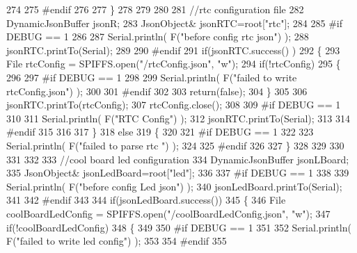 \begin{DoxyCode}
274     
275 \textcolor{preprocessor}{    #endif}
276 
277     \}
278     
279     
280     
281     \textcolor{comment}{//rtc configuration file}
282     DynamicJsonBuffer jsonR;
283         JsonObject& jsonRTC=root[\textcolor{stringliteral}{"rtc"}];
284 
285 \textcolor{preprocessor}{#if DEBUG == 1 }
286     
287     Serial.println( F(\textcolor{stringliteral}{"before config rtc json"}) );
288     jsonRTC.printTo(Serial);
289 
290 \textcolor{preprocessor}{#endif}
291     \textcolor{keywordflow}{if}(jsonRTC.success() )
292     \{
293         File rtcConfig = SPIFFS.open(\textcolor{stringliteral}{"/rtcConfig.json"}, \textcolor{stringliteral}{"w"});   
294         \textcolor{keywordflow}{if}(!rtcConfig)
295         \{
296         
297 \textcolor{preprocessor}{        #if DEBUG == 1 }
298 
299             Serial.println( F(\textcolor{stringliteral}{"failed to write rtcConfig.json"}) );
300 
301 \textcolor{preprocessor}{        #endif}
302 
303             \textcolor{keywordflow}{return}(\textcolor{keyword}{false});
304         \}
305 
306         jsonRTC.printTo(rtcConfig);
307         rtcConfig.close();
308 
309 \textcolor{preprocessor}{    #if DEBUG == 1 }
310 
311         Serial.println( F(\textcolor{stringliteral}{"RTC Config"}) );
312         jsonRTC.printTo(Serial);
313     
314 \textcolor{preprocessor}{    #endif}
315 
316     
317     \}
318     \textcolor{keywordflow}{else}
319     \{
320     
321 \textcolor{preprocessor}{    #if DEBUG == 1 }
322 
323         Serial.println( F(\textcolor{stringliteral}{"failed to parse rtc "}) );
324     
325 \textcolor{preprocessor}{    #endif}
326 
327     \}
328 
329     
330     
331     
332     
333         \textcolor{comment}{//cool board led configuration}
334     DynamicJsonBuffer jsonLBoard;
335         JsonObject& jsonLedBoard=root[\textcolor{stringliteral}{"led"}];
336     
337 \textcolor{preprocessor}{#if DEBUG == 1 }
338 
339     Serial.println( F(\textcolor{stringliteral}{"before config Led json"}) );
340     jsonLedBoard.printTo(Serial);
341 
342 \textcolor{preprocessor}{#endif}
343 
344     \textcolor{keywordflow}{if}(jsonLedBoard.success())
345     \{   
346         File coolBoardLedConfig = SPIFFS.open(\textcolor{stringliteral}{"/coolBoardLedConfig.json"}, \textcolor{stringliteral}{"w"}); 
347         \textcolor{keywordflow}{if}(!coolBoardLedConfig)
348         \{
349         
350 \textcolor{preprocessor}{        #if DEBUG == 1 }
351         
352             Serial.println( F(\textcolor{stringliteral}{"failed to write led config"}) );
353         
354 \textcolor{preprocessor}{        #endif}
355 

\end{DoxyCode}

